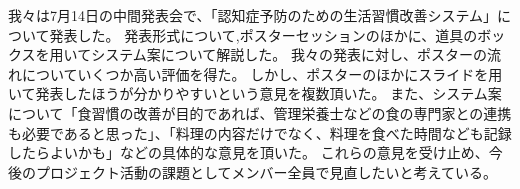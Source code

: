 \documentclass[../report]{subfiles}
\begin{document}
我々は7月14日の中間発表会で、「認知症予防のための生活習慣改善システム」について発表した。
発表形式について,ポスターセッションのほかに、道具のボックスを用いてシステム案について解説した。
我々の発表に対し、ポスターの流れについていくつか高い評価を得た。
しかし、ポスターのほかにスライドを用いて発表したほうが分かりやすいという意見を複数頂いた。
また、システム案について「食習慣の改善が目的であれば、管理栄養士などの食の専門家との連携も必要であると思った」、「料理の内容だけでなく、料理を食べた時間なども記録したらよいかも」などの具体的な意見を頂いた。
これらの意見を受け止め、今後のプロジェクト活動の課題としてメンバー全員で見直したいと考えている。
\end{document}
